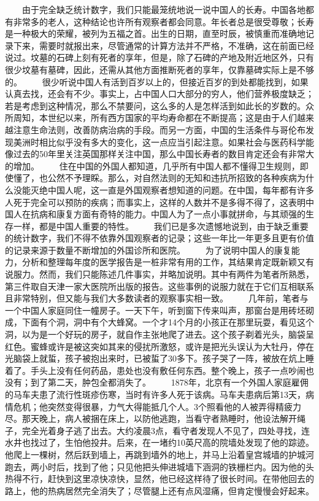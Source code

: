 \documentclass[12pt,oneside]{book}
\begin{document}
\begin{common-format}
　　由于完全缺乏统计数字，我们只能最笼统地说一说中国人的长寿。中国各地都有非常多的老人，这种结论也许所有观察者都会同意。年长者总是很受尊敬；长寿是一种极大的荣耀，被列为五福之首。出生的日期，直至时辰，被慎重而准确地记录下来，需要时就报出来，尽管通常的计算方法并不严格，不准确，这在前面已经说过。坟墓的石碑上刻有死者的享年，但是，除了石碑的产地及附近地区外，只有很少坟墓有墓碑，因此，还需从其他方面推断死者的享年，仅靠墓碑实际上是不够的。 
　　很少听说中国人有活到百岁以上的，但接近百岁的到处都能找到，如果认真去找，还会有不少。事实上，占中国人口大部分的穷人，他们营养极度缺乏；若是考虑到这种情况，那么不禁要问，这么多的人是怎样活到如此长的岁数的。众所周知，本世纪以来，所有西方国家的平均寿命都在不断提高；这是由于人们越来越注意生命法则，改善防病治病的手段。而另一方面，中国的生活条件与哥伦布发现美洲时相比似乎没有多大的变化，这一点应当引起注意。如果社会与医药科学能像过去的50年里关注英国那样关注中国，那么中国长寿者的数目肯定还会有非常大的增加。 
　　住在中国的外国人都知道，几乎所有中国人都不懂得卫生规则，即使懂了，也公然不予理睬。那么，对自然法则的无知和违抗所招致的各种疾病为什么没能灭绝中国人呢，这一直是外国观察者想知道的问题。在中国，每年都有许多人死于完全可以预防的疾病；而事实上，这样的人数并不是多得不得了，这表明中国人在抗病和康复方面有奇特的能力。中国人为了一点小事就拼命，与其顽强的生存一样，都是中国人重要的特性。 
　　我们已是多次遗憾地说到，由于缺乏重要的统计数字，我们不得不依靠外国观察者的记录；这些一年比一年更多且更有价值的记录来源于数量不断增加的外国诊所和医院。 
　　为了说明中国人的康复能力，分析和整理每年度的医学报告是一桩非常有用的工作，其结果肯定既新颖又有说服力。然而，我们只能陈述几件事实，并略加说明。其中有两件为笔者所熟悉，第三件取自天津一家大医院所出版的报告。这些事例的说服力就在于它们互相联系且非常特别，但又能与我们大多数读者的观察事实相一致。 
　　几年前，笔者与一个中国人家庭同住一幢房子。一天下午，听到窗下传来叫声，那窗台是用砖坯砌成，下面有个洞，洞中有个大蜂窝。一个才14个月的小孩正在那里玩耍，看见这个洞，以为是一个好玩的房子，就自作主张地爬了进去。这个孩子剃着光头，脑袋呈红色。蜜蜂或许是被这突如其来的侵扰所激怒，或许是把光头误认为大牡丹，停在光脑袋上就蜇，孩子被抱出来时，已被蜇了30多下。孩子哭了一阵，被放在炕上睡着了。手头上没有任何药品，患处也没有敷任何东西。整个晚上，孩子一点吵闹也没有；到了第二天，肿包全都消失了。 
　　1878年，北京有一个外国人家庭雇佣的马车夫患了流行性斑疹伤寒，当时有许多人死于该病。马车夫患病后第13天，病情危机；他突然变得很暴，力气大得能抵几个人。3个照看他的人被弄得精疲力尽。那天晚上，病人被捆在床上，以防他逃跑，当看守者熟睡时，他设法解开绳子，完全光着身子逃了出去。大约凌晨3点，看守者发现人不见了，四处寻找，连水井也找过了，生怕他投井。后来，在一堵约10英尺高的院墙处发现了他的踪迹。他爬上一棵树，然后跃到墙上，再跳到墙外的地上，并马上沿着皇宫城墙的护城河跑去，两小时后，找到了他；只见他把头伸进城墙下涵洞的铁栅栏内。因为他的头热得不行，赶快到这里凉快凉快，显然，他已经这样待了很长时间。在带他回去的路上，他的热病居然完全消失了；尽管腿上还有点风湿痛，但肯定慢慢会好起来。 

\end{common-format}
\end{document}
